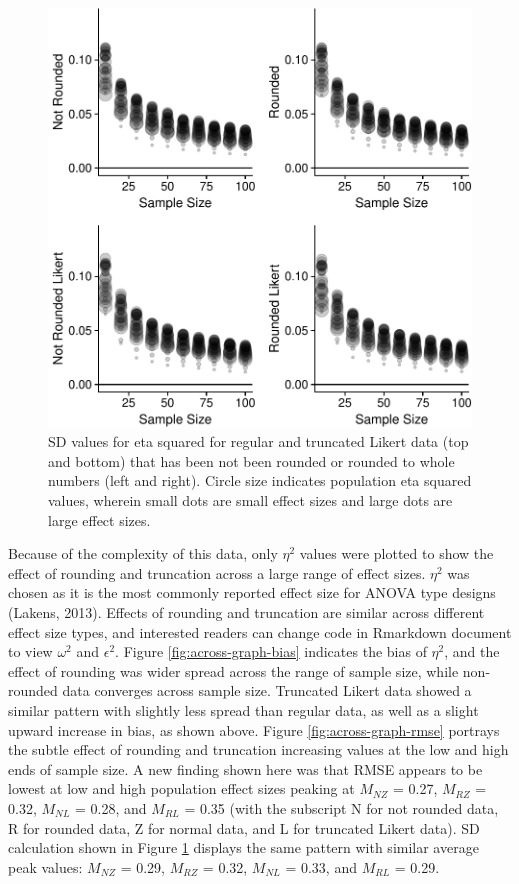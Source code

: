 \documentclass[english,man]{apa6}
\theoremstyle{definition}
\theoremstyle{definition}
\theoremstyle{definition}
\theoremstyle{remark}
\begin{document}
\begin{figure}
\centering
\includegraphics{buchanan_scofield_version2_files/figure-latex/across-graph-sd-1.pdf}
\caption{\label{fig:across-graph-sd}SD values for eta squared for regular
and truncated Likert data (top and bottom) that has been not been
rounded or rounded to whole numbers (left and right). Circle size
indicates population eta squared values, wherein small dots are small
effect sizes and large dots are large effect sizes.}
\end{figure}

Because of the complexity of this data, only \(\eta^2\) values were
plotted to show the effect of rounding and truncation across a large
range of effect sizes. \(\eta^2\) was chosen as it is the most commonly
reported effect size for ANOVA type designs (Lakens, 2013). Effects of
rounding and truncation are similar across different effect size types,
and interested readers can change code in Rmarkdown document to view
\(\omega^2\) and \(\epsilon^2\). Figure \ref{fig:across-graph-bias}
indicates the bias of \(\eta^2\), and the effect of rounding was wider
spread across the range of sample size, while non-rounded data converges
across sample size. Truncated Likert data showed a similar pattern with
slightly less spread than regular data, as well as a slight upward
increase in bias, as shown above. Figure \ref{fig:across-graph-rmse}
portrays the subtle effect of rounding and truncation increasing values
at the low and high ends of sample size. A new finding shown here was
that RMSE appears to be lowest at low and high population effect sizes
peaking at \(M_{NZ}\) = 0.27, \(M_{RZ}\) = 0.32, \(M_{NL}\) = 0.28, and
\(M_{RL}\) = 0.35 (with the subscript N for not rounded data, R for
rounded data, Z for normal data, and L for truncated Likert data). SD
calculation shown in Figure \ref{fig:across-graph-sd} displays the same
pattern with similar average peak values: \(M_{NZ}\) = 0.29, \(M_{RZ}\)
= 0.32, \(M_{NL}\) = 0.33, and \(M_{RL}\) = 0.29.
\end{document}
